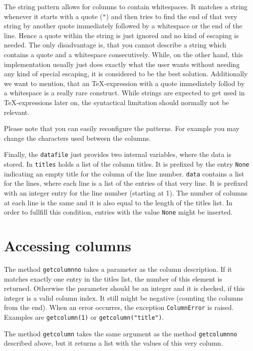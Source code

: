 The string pattern allows for columns to contain whitespaces. It
matches a string whenever it starts with a quote (\verb|"|) and then
tries to find the end of that very string by another quote immediately
followed by a whitespace or the end of the line. Hence a quote
within the string is just ignored and no kind of escaping is needed.
The only disadvantage is, that you cannot describe a string which
contains a quote and a whitespace consecutively. While, on the
other hand, this implementation usually just does exactly what the
user wants without needing any kind of special escaping, it is
considered to be the best solution. Additionally we want to mention,
that an \TeX-expression with a quote immediately follod by a
whitespace is a really rare construct. While strings are expected to
get used in \TeX-expressions later on, the syntactical limitation
should normally not be relevant.

Please note that you can easily reconfigure the patterns. For example
you may change the characters used between the columns.

Finally, the \verb|datafile| just provides two internal variables,
where the data is stored. In \verb|titles| holds a list of the column
titles. It is prefixed by the entry \verb|None| indicating an empty
title for the column of the line number. \verb|data| contains a list
for the lines, where each line is a list of the entries of that very
line. It is prefixed with an integer entry for the line number
(starting at 1). The number of columns at each line is the same and it
is also equal to the length of the titles list. In order to fullfill
this condition, entries with the value \verb|None| might be inserted.

\section{Accessing columns}

The method \verb|getcolumnno| takes a parameter as the column
description. If it matches exactly one entry in the titles list, the
number of this element is returned. Otherwise the parameter should be
an integer and it is checked, if this integer is a valid column index.
It still might be negative (counting the columns from the end).
When an error occurres, the exception \verb|ColumnError| is raised.
Examples are \verb|getcolumn(1)| or \verb|getcolumn("title")|.

The method \verb|getcolumn| takes the same argument as the method
\verb|getcolumnno| described above, but it returns a list with the
values of this very column.

